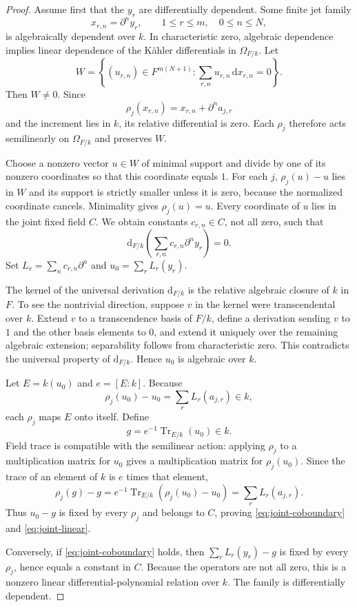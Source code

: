 \documentclass[11pt]{article}
\numberwithin{equation}{section}
\theoremstyle{definition}
\theoremstyle{remark}
\newcommand{\Tr}{\operatorname{Tr}}
\newcommand{\dd}{\mathrm d}
\begin{document}
\begin{proof}
Assume first that the $y_r$ are differentially dependent.  Some finite jet
family
\[
 x_{r,n}=\partial^ny_r,
 \qquad 1\leq r\leq m,\quad 0\leq n\leq N,
\]
is algebraically dependent over $k$.  In characteristic zero, algebraic
dependence implies linear dependence of the K\"ahler differentials in
$\Omega_{F/k}$.  Let
\[
 W=\left\{(u_{r,n})\in F^{m(N+1)}:
       \sum_{r,n}u_{r,n}\,\dd x_{r,n}=0\right\}.
\]
Then $W\neq0$.  Since
\[
 \rho_j(x_{r,n})=x_{r,n}+\partial^na_{j,r}
\]
and the increment lies in $k$, its relative differential is zero.  Each
$\rho_j$ therefore acts semilinearly on $\Omega_{F/k}$ and preserves $W$.

Choose a nonzero vector $u\in W$ of minimal support and divide by one of its
nonzero coordinates so that this coordinate equals $1$.  For each $j$,
$\rho_j(u)-u$ lies in $W$ and its support is strictly smaller unless it is
zero, because the normalized coordinate cancels.  Minimality gives
$\rho_j(u)=u$.  Every coordinate of $u$ lies in the joint fixed field $C$.
We obtain constants $c_{r,n}\in C$, not all zero, such that
\[
 \dd_{F/k}\left(\sum_{r,n}c_{r,n}\partial^ny_r\right)=0.
\]
Set $L_r=\sum_n c_{r,n}\partial^n$ and
$u_0=\sum_rL_r(y_r)$.

The kernel of the universal derivation $\dd_{F/k}$ is the relative
algebraic closure of $k$ in $F$.  To see the nontrivial direction, suppose
$v$ in the kernel were transcendental over $k$.  Extend $v$ to a
transcendence basis of $F/k$, define a derivation sending $v$ to $1$ and the
other basis elements to $0$, and extend it uniquely over the remaining
algebraic extension; separability follows from characteristic zero.  This
contradicts the universal property of $\dd_{F/k}$.  Hence $u_0$ is algebraic
over $k$.

Let $E=k(u_0)$ and $e=[E:k]$.  Because
\[
 \rho_j(u_0)-u_0=\sum_rL_r(a_{j,r})\in k,
\]
each $\rho_j$ maps $E$ onto itself.  Define
\[
 g=e^{-1}\Tr_{E/k}(u_0)\in k.
\]
Field trace is compatible with the semilinear action: applying $\rho_j$ to
a multiplication matrix for $u_0$ gives a multiplication matrix for
$\rho_j(u_0)$.  Since the trace of an element of $k$ is $e$ times that
element,
\[
 \rho_j(g)-g
 =e^{-1}\Tr_{E/k}(\rho_j(u_0)-u_0)
 =\sum_rL_r(a_{j,r}).
\]
Thus $u_0-g$ is fixed by every $\rho_j$ and belongs to $C$, proving
\eqref{eq:joint-coboundary} and \eqref{eq:joint-linear}.

Conversely, if \eqref{eq:joint-coboundary} holds, then
$\sum_rL_r(y_r)-g$ is fixed by every $\rho_j$, hence equals a constant in
$C$.  Because the operators are not all zero, this is a nonzero linear
differential-polynomial relation over $k$.  The family is differentially
dependent.
\end{proof}
\end{document}
